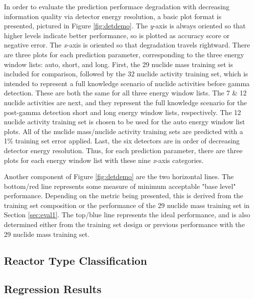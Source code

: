 In order to evaluate the prediction performace degradation with decreasing
information quality via detector energy resolution, a basic plot format is
presented, pictured in Figure \ref{fig:detdemo}. The \textit{y}-axis is always
oriented so that higher levels indicate better performance, so is plotted as
accuracy score or negative error.  The \textit{x}-axis is oriented so that
degradation travels rightward. There are three plots for each prediction
parameter, corresponding to the three energy window lists: auto, short, and
long.  First, the 29 nuclide mass training set is included for comparison,
followed by the 32 nuclide activity training set, which is intended to
represent a full knowledge scenario of nuclide activities before gamma
detection. These are both the same for all three energy window lists.  The 7 \&
12 nuclide activities are next, and they represent the full knowledge scenario
for the post-gamma detection short and long energy window lists, respectively.
The 12 nuclide activity training set is chosen to be used for the auto energy
window list plots.  All of the nuclide mass/nuclide activity training sets are
predicted with a 1\% training set error applied.  Last, the six detectors are
in order of decreasing detector energy resolution. Thus, for each prediction
parameter, there are three plots for each energy window list with these nine
\textit{x}-axis categories.

Another component of Figure \ref{fig:detdemo} are the two horizontal lines. The
bottom/red line represents some measure of minimum acceptable "base level"
performance.  Depending on the metric being presented, this is derived from the
training set composition or the performance of the 29 nuclide mass training set
in Section \ref{sec:eval1}. The top/blue line represents the ideal performance,
and is also determined either from the training set design or previous
performance with the 29 nuclide mass training set.


\subsection{Reactor Type Classification}


\subsection{Regression Results}



